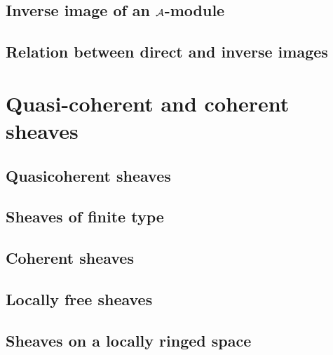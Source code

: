         \subsection{Inverse image of an $\mathcal{A}$-module}
        \label{0-prelim-4.3}
        

        \subsection{Relation between direct and inverse images}
        \label{0-prelim-4.4}
        

    \section{Quasi-coherent and coherent sheaves}
    \label{0-prelim-5}

        \subsection{Quasicoherent sheaves}
        \label{0-prelim-5.1}
        

        \subsection{Sheaves of finite type}
        \label{0-prelim-5.2}
        

        \subsection{Coherent sheaves}
        \label{0-prelim-5.3}
        

        \subsection{Locally free sheaves}
        \label{0-prelim-5.4}
        

        \subsection{Sheaves on a locally ringed space}
        \label{0-prelim-5.5}
        

